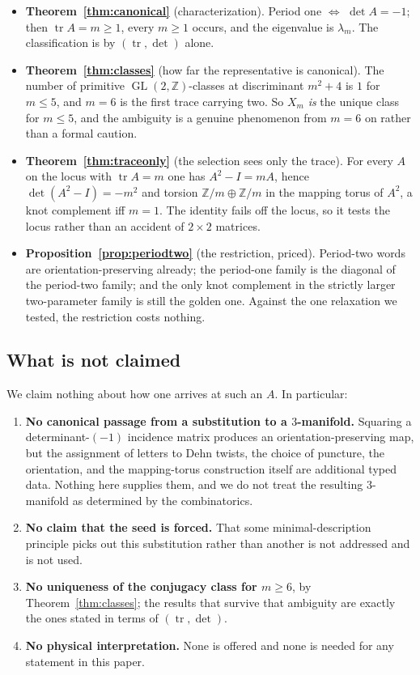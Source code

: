 \documentclass[11pt,a4paper]{article}
\theoremstyle{definition}
\theoremstyle{remark}
\newcommand{\GL}{\operatorname{GL}}
\newcommand{\Z}{\mathbb{Z}}
\newcommand{\tr}{\operatorname{tr}}
\begin{document}
\begin{itemize}[leftmargin=1.4em]
\item \textbf{Theorem~\ref{thm:canonical}} (characterization). Period one $\iff$ $\det A=-1$;
      then $\tr A=m\ge1$, every $m\ge1$ occurs, and the eigenvalue is $\lambda_m$. The
      classification is by $(\tr,\det)$ alone.
\item \textbf{Theorem~\ref{thm:classes}} (how far the representative is canonical). The number
      of primitive $\GL(2,\Z)$-classes at discriminant $m^2+4$ is $1$ for $m\le5$, and $m=6$
      is the first trace carrying two. So $X_m$ \emph{is} the unique class for $m\le5$, and
      the ambiguity is a genuine phenomenon from $m=6$ on rather than a formal caution.
\item \textbf{Theorem~\ref{thm:traceonly}} (the selection sees only the trace). For every $A$
      on the locus with $\tr A=m$ one has $A^2-I=mA$, hence $\det(A^2-I)=-m^2$ and torsion
      $\Z/m\oplus\Z/m$ in the mapping torus of $A^2$, a knot complement iff $m=1$. The identity
      fails off the locus, so it tests the locus rather than an accident of $2\times2$ matrices.
\item \textbf{Proposition~\ref{prop:periodtwo}} (the restriction, priced). Period-two words are
      orientation-preserving already; the period-one family is the diagonal of the period-two
      family; and the only knot complement in the strictly larger two-parameter family is
      still the golden one. Against the one relaxation we tested, the restriction costs
      nothing.
\end{itemize}

\subsection{What is not claimed}\label{sec:notclaimed}

We claim nothing about how one arrives at such an $A$. In particular:

\begin{enumerate}[label=(\alph*),leftmargin=1.8em]
\item \textbf{No canonical passage from a substitution to a $3$-manifold.} Squaring a
      determinant-$(-1)$ incidence matrix produces an orientation-preserving map, but the
      assignment of letters to Dehn twists, the choice of puncture, the orientation, and the
      mapping-torus construction itself are additional typed data. Nothing here supplies them,
      and we do not treat the resulting $3$-manifold as determined by the combinatorics.
\item \textbf{No claim that the seed is forced.} That some minimal-description principle picks
      out this substitution rather than another is not addressed and is not used.
\item \textbf{No uniqueness of the conjugacy class for $m\ge6$}, by Theorem~\ref{thm:classes};
      the results that survive that ambiguity are exactly the ones stated in terms of $(\tr,\det)$.
\item \textbf{No physical interpretation.} None is offered and none is needed for any statement
      in this paper.
\end{enumerate}
\end{document}
